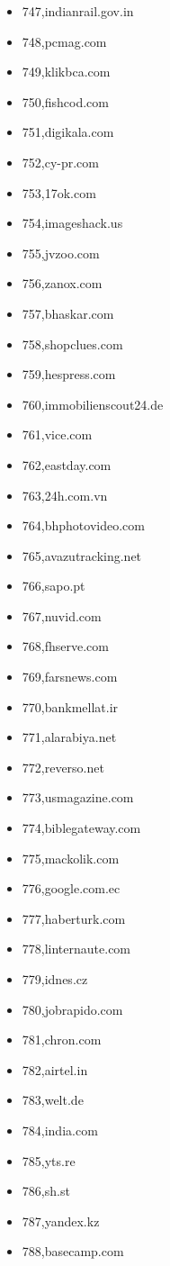 \begin{multicols}{3}
\begin{itemize}
	\item 747,indianrail.gov.in
	\item 748,pcmag.com
	\item 749,klikbca.com
	\item 750,fishcod.com
	\item 751,digikala.com
	\item 752,cy-pr.com
	\item 753,17ok.com
	\item 754,imageshack.us
	\item 755,jvzoo.com
	\item 756,zanox.com
	\item 757,bhaskar.com
	\item 758,shopclues.com
	\item 759,hespress.com
	\item 760,immobilienscout24.de
	\item 761,vice.com
	\item 762,eastday.com
	\item 763,24h.com.vn
	\item 764,bhphotovideo.com
	\item 765,avazutracking.net
	\item 766,sapo.pt
	\item 767,nuvid.com
	\item 768,fhserve.com
	\item 769,farsnews.com
	\item 770,bankmellat.ir
	\item 771,alarabiya.net
	\item 772,reverso.net
	\item 773,usmagazine.com
	\item 774,biblegateway.com
	\item 775,mackolik.com
	\item 776,google.com.ec
	\item 777,haberturk.com
	\item 778,linternaute.com
	\item 779,idnes.cz
	\item 780,jobrapido.com
	\item 781,chron.com
	\item 782,airtel.in
	\item 783,welt.de
	\item 784,india.com
	\item 785,yts.re
	\item 786,sh.st
	\item 787,yandex.kz
	\item 788,basecamp.com

\end{itemize}
\end{multicols}
